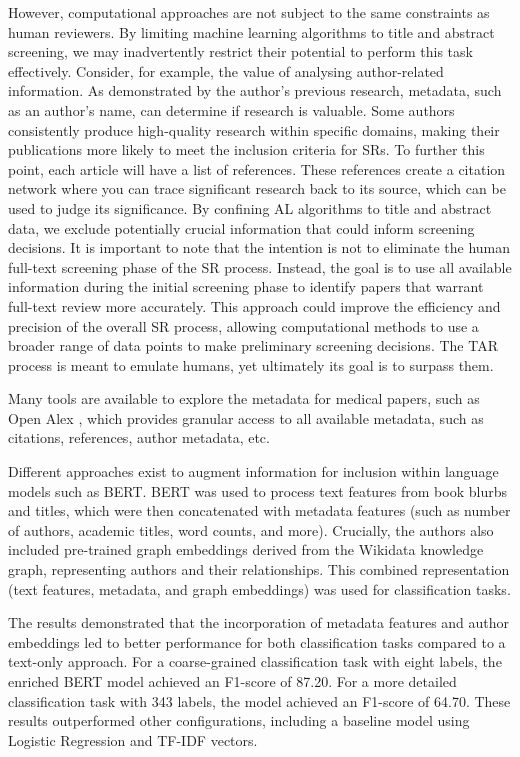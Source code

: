 \documentclass[../main.tex]{subfiles}
\begin{document}
However, computational approaches are not subject to the same constraints as human reviewers. By limiting machine learning algorithms to title and abstract screening, we may inadvertently restrict their potential to perform this task effectively.
Consider, for example, the value of analysing author-related information. As demonstrated by the author's previous research, metadata, such as an author's name, can determine if research is valuable. Some authors consistently produce high-quality research within specific domains, making their publications more likely to meet the inclusion criteria for SRs.
To further this point, each article will have a list of references. These references create a citation network where you can trace significant research back to its source, which can be used to judge its significance.
By confining AL algorithms to title and abstract data, we exclude potentially crucial information that could inform screening decisions. It is important to note that the intention is not to eliminate the human full-text screening phase of the SR process. Instead, the goal is to use all available information during the initial screening phase to identify papers that warrant full-text review more accurately.
This approach could improve the efficiency and precision of the overall SR process, allowing computational methods to use a broader range of data points to make preliminary screening decisions. The TAR process is meant to emulate humans, yet ultimately its goal is to surpass them. 

Many tools are available to explore the metadata for medical papers, such as Open Alex \cite{priem_openalex_2022}, which provides granular access to all available metadata, such as citations, references, author metadata, etc. 

Different approaches exist to augment information for inclusion within language models such as BERT. BERT was used to process text features from book blurbs and titles, which were then concatenated with metadata features (such as number of authors, academic titles, word counts, and more)\cite{ostendorff_enriching_2019}. Crucially, the authors also included pre-trained graph embeddings derived from the Wikidata knowledge graph, representing authors and their relationships. This combined representation (text features, metadata, and graph embeddings) was used for classification tasks.

The results demonstrated that the incorporation of metadata features and author embeddings led to better performance for both classification tasks compared to a text-only approach. For a coarse-grained classification task with eight labels, the enriched BERT model achieved an F1-score of 87.20. For a more detailed classification task with 343 labels, the model achieved an F1-score of 64.70. These results outperformed other configurations, including a baseline model using Logistic Regression and TF-IDF vectors.
\end{document}
